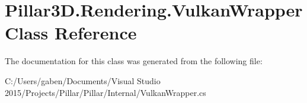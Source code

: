 \hypertarget{class_pillar3_d_1_1_rendering_1_1_vulkan_wrapper}{}\section{Pillar3\+D.\+Rendering.\+Vulkan\+Wrapper Class Reference}
\label{class_pillar3_d_1_1_rendering_1_1_vulkan_wrapper}


The documentation for this class was generated from the following file\+:\begin{DoxyCompactItemize}
\item 
C\+:/\+Users/gaben/\+Documents/\+Visual Studio 2015/\+Projects/\+Pillar/\+Pillar/\+Internal/Vulkan\+Wrapper.\+cs\end{DoxyCompactItemize}
